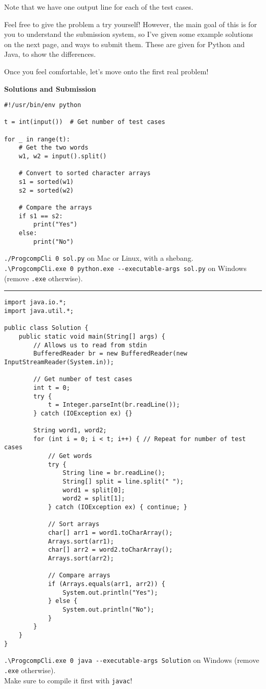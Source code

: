 Note that we have one output line for each of the test cases.

Feel free to give the problem a try yourself! 
However, the main goal of this is for you to understand the submission system, so I've given some example solutions on the next page, and ways to submit them.
These are given for Python and Java, to show the differences.

Once you feel comfortable, let's move onto the first real problem!

\newpage

\textbf{Solutions and Submission}

\lstset{language=python}
\begin{lstlisting}
#!/usr/bin/env python

t = int(input())  # Get number of test cases

for _ in range(t):
    # Get the two words
    w1, w2 = input().split()

    # Convert to sorted character arrays
    s1 = sorted(w1)
    s2 = sorted(w2)

    # Compare the arrays
    if s1 == s2:
        print("Yes")
    else:
        print("No")

\end{lstlisting}

\small
\texttt{./ProgcompCli 0 sol.py} on Mac or Linux, with a shebang. \\
\texttt{.\textbackslash ProgcompCli.exe 0 python.exe -{}-executable-args sol.py} on Windows (remove \texttt{.exe} otherwise).

\vspace{8pt}
\hrule

\lstset{language=java}
\begin{lstlisting}
import java.io.*;
import java.util.*;

public class Solution {
    public static void main(String[] args) {
        // Allows us to read from stdin
        BufferedReader br = new BufferedReader(new InputStreamReader(System.in));

        // Get number of test cases
        int t = 0;
        try {
            t = Integer.parseInt(br.readLine());
        } catch (IOException ex) {}

        String word1, word2;
        for (int i = 0; i < t; i++) { // Repeat for number of test cases
            // Get words
            try {
                String line = br.readLine();
                String[] split = line.split(" ");
                word1 = split[0];
                word2 = split[1];
            } catch (IOException ex) { continue; }
            
            // Sort arrays
            char[] arr1 = word1.toCharArray();
            Arrays.sort(arr1);
            char[] arr2 = word2.toCharArray();
            Arrays.sort(arr2);

            // Compare arrays
            if (Arrays.equals(arr1, arr2)) {
                System.out.println("Yes");
            } else {
                System.out.println("No");
            }
        }
    }
}
\end{lstlisting}

\texttt{.\textbackslash ProgcompCli.exe 0 java -{}-executable-args Solution} on Windows (remove \texttt{.exe} otherwise).
\\ Make sure to compile it first with \texttt{javac}!

\normalsize